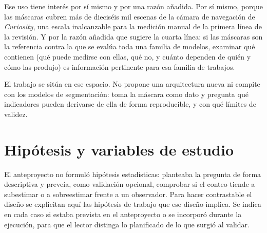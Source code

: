 Ese uso tiene interés por sí mismo y por una razón añadida. Por sí mismo, porque las máscaras
cubren más de dieciséis mil escenas de la cámara de navegación de \textit{Curiosity}, una
escala inalcanzable para la medición manual de la primera línea de la revisión. Y por la razón
añadida que sugiere la cuarta línea: si las máscaras son la referencia contra la que se evalúa
toda una familia de modelos, examinar qué contienen (qué puede medirse con ellas, qué no, y
cuánto dependen de quién y cómo las produjo) es información pertinente para esa familia de
trabajos.

El trabajo se sitúa en ese espacio. No propone una arquitectura nueva ni compite con los
modelos de segmentación: toma la máscara como dato y pregunta qué indicadores pueden
derivarse de ella de forma reproducible, y con qué límites de validez.

\section{Hipótesis y variables de estudio}
\label{sec:hipotesis}

El anteproyecto no formuló hipótesis estadísticas: planteaba la pregunta de forma descriptiva
y preveía, como validación opcional, comprobar si el conteo tiende a subestimar o a
sobreestimar frente a un observador. Para hacer contrastable el diseño se explicitan aquí las
hipótesis de trabajo que ese diseño implica. Se indica en cada caso si estaba prevista en el
anteproyecto o se incorporó durante la ejecución, para que el lector distinga lo planificado
de lo que surgió al validar.

